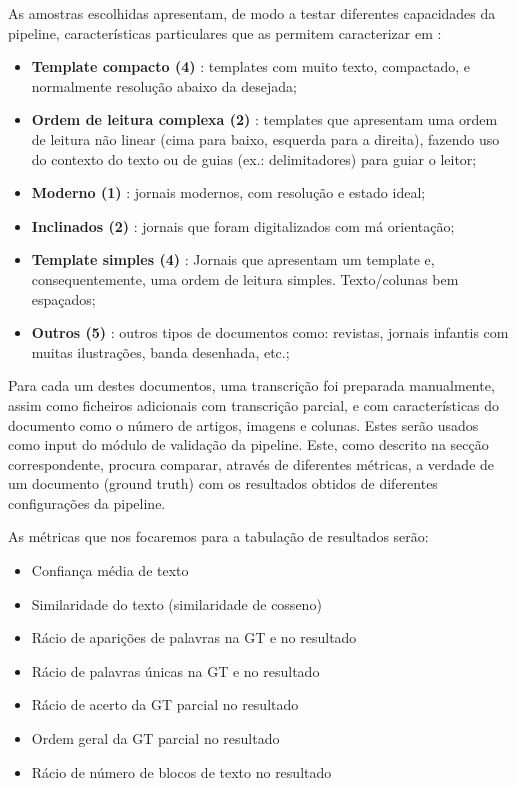As amostras escolhidas apresentam, de modo a testar diferentes capacidades da pipeline, características particulares que as permitem caracterizar em :

\begin{itemize}\setlength\itemsep{-0.9em}
	\item \textbf{Template compacto (4)} : templates com muito texto, compactado, e normalmente resolução abaixo da desejada; 
	\item \textbf{Ordem de leitura complexa (2)} : templates que apresentam uma ordem de leitura não linear (cima para baixo, esquerda para a direita), fazendo uso do contexto do texto ou de guias (ex.: delimitadores) para guiar o leitor;
	\item \textbf{Moderno (1)} : jornais modernos, com resolução e estado ideal;
	\item \textbf{Inclinados (2)} : jornais que foram digitalizados com má orientação;
	\item \textbf{Template simples (4)} : Jornais que apresentam um template e, consequentemente, uma ordem de leitura simples. Texto/colunas bem espaçados;
	\item \textbf{Outros (5)} : outros tipos de documentos como: revistas, jornais infantis com muitas ilustrações, banda desenhada, etc.;
\end{itemize}

Para cada um destes documentos, uma transcrição foi preparada manualmente, assim como ficheiros adicionais com transcrição parcial, e com características do documento como o número de artigos, imagens e colunas. 
Estes serão usados como input do módulo de validação da pipeline. Este, como descrito na secção correspondente, procura comparar, através de diferentes métricas, a verdade de um documento (ground truth) com os resultados obtidos de diferentes configurações da pipeline.

As métricas que nos focaremos para a tabulação de resultados serão:

\begin{itemize}\setlength\itemsep{-0.9em}
	\item Confiança média de texto
	\item Similaridade do texto (similaridade de cosseno)
	\item Rácio de aparições de palavras na GT e no resultado
	\item Rácio de palavras únicas na GT e no resultado
	\item Rácio de acerto da GT parcial no resultado
	\item Ordem geral da GT parcial no resultado
	\item Rácio de número de blocos de texto no resultado
\end{itemize}



